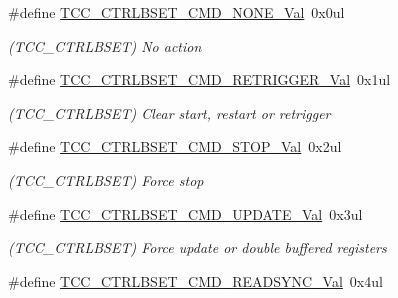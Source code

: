 \begin{DoxyCompactItemize}
\item 
\hypertarget{group___s_a_m_l21___t_c_c_gaee30d48439f42de18019d24103916ef2}{}\#define \hyperlink{group___s_a_m_l21___t_c_c_gaee30d48439f42de18019d24103916ef2}{T\+C\+C\+\_\+\+C\+T\+R\+L\+B\+S\+E\+T\+\_\+\+C\+M\+D\+\_\+\+N\+O\+N\+E\+\_\+\+Val}~0x0ul\label{group___s_a_m_l21___t_c_c_gaee30d48439f42de18019d24103916ef2}

\begin{DoxyCompactList}\small\item\em (T\+C\+C\+\_\+\+C\+T\+R\+L\+B\+S\+E\+T) No action \end{DoxyCompactList}\item 
\hypertarget{group___s_a_m_l21___t_c_c_ga5eb0ee96a9fc1d475a9e1c8b750551ac}{}\#define \hyperlink{group___s_a_m_l21___t_c_c_ga5eb0ee96a9fc1d475a9e1c8b750551ac}{T\+C\+C\+\_\+\+C\+T\+R\+L\+B\+S\+E\+T\+\_\+\+C\+M\+D\+\_\+\+R\+E\+T\+R\+I\+G\+G\+E\+R\+\_\+\+Val}~0x1ul\label{group___s_a_m_l21___t_c_c_ga5eb0ee96a9fc1d475a9e1c8b750551ac}

\begin{DoxyCompactList}\small\item\em (T\+C\+C\+\_\+\+C\+T\+R\+L\+B\+S\+E\+T) Clear start, restart or retrigger \end{DoxyCompactList}\item 
\hypertarget{group___s_a_m_l21___t_c_c_ga18deff780417a2e186372a579405ec92}{}\#define \hyperlink{group___s_a_m_l21___t_c_c_ga18deff780417a2e186372a579405ec92}{T\+C\+C\+\_\+\+C\+T\+R\+L\+B\+S\+E\+T\+\_\+\+C\+M\+D\+\_\+\+S\+T\+O\+P\+\_\+\+Val}~0x2ul\label{group___s_a_m_l21___t_c_c_ga18deff780417a2e186372a579405ec92}

\begin{DoxyCompactList}\small\item\em (T\+C\+C\+\_\+\+C\+T\+R\+L\+B\+S\+E\+T) Force stop \end{DoxyCompactList}\item 
\hypertarget{group___s_a_m_l21___t_c_c_ga7545fc6153e0191ee8f497626039f764}{}\#define \hyperlink{group___s_a_m_l21___t_c_c_ga7545fc6153e0191ee8f497626039f764}{T\+C\+C\+\_\+\+C\+T\+R\+L\+B\+S\+E\+T\+\_\+\+C\+M\+D\+\_\+\+U\+P\+D\+A\+T\+E\+\_\+\+Val}~0x3ul\label{group___s_a_m_l21___t_c_c_ga7545fc6153e0191ee8f497626039f764}

\begin{DoxyCompactList}\small\item\em (T\+C\+C\+\_\+\+C\+T\+R\+L\+B\+S\+E\+T) Force update or double buffered registers \end{DoxyCompactList}\item 
\hypertarget{group___s_a_m_l21___t_c_c_ga3c90262c803fdab651abc28a04bf6340}{}\#define \hyperlink{group___s_a_m_l21___t_c_c_ga3c90262c803fdab651abc28a04bf6340}{T\+C\+C\+\_\+\+C\+T\+R\+L\+B\+S\+E\+T\+\_\+\+C\+M\+D\+\_\+\+R\+E\+A\+D\+S\+Y\+N\+C\+\_\+\+Val}~0x4ul\label{group___s_a_m_l21___t_c_c_ga3c90262c803fdab651abc28a04bf6340}


\end{DoxyCompactItemize}
